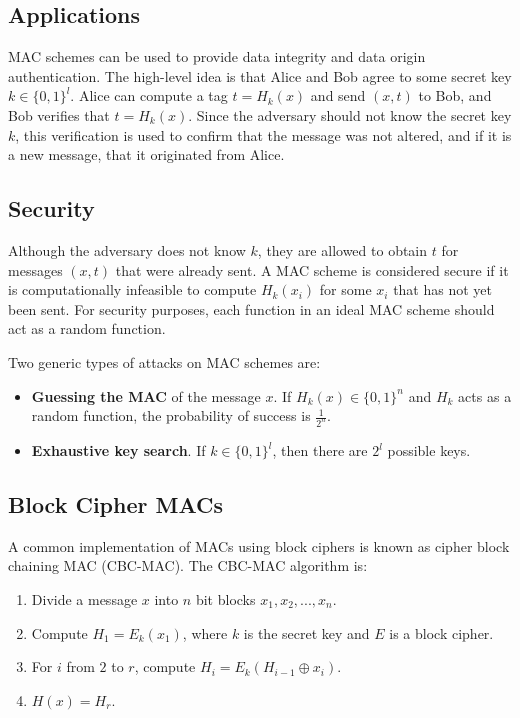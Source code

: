 \documentclass[12pt,titlepage]{article}
\begin{document}
    \subsection{Applications}
      MAC schemes can be used to provide data integrity and data origin authentication. The high-level idea is that Alice and Bob agree to some secret key $k \in \{0, 1\}^l$.
      Alice can compute a tag $t = H_k(x)$ and send $(x, t)$ to Bob, and Bob verifies that $t = H_k(x)$. Since the adversary should not know the secret key $k$, this verification
      is used to confirm that the message was not altered, and if it is a new message, that it originated from Alice.

    \subsection{Security}
      Although the adversary does not know $k$, they are allowed to obtain $t$ for messages $(x, t)$ that were already sent. A MAC scheme is considered secure if it is
      computationally infeasible to compute $H_k(x_i)$ for some $x_i$ that has not yet been sent. For security purposes, each function in an ideal MAC scheme should act
      as a random function.

      Two generic types of attacks on MAC schemes are:
      \begin{itemize}
        \item \textbf{Guessing the MAC} of the message $x$. If $H_k(x) \in \{0, 1\}^n$ and $H_k$ acts as a random function, the probability of success is $\frac{1}{2^n}$.
        \item \textbf{Exhaustive key search}. If $k \in \{0, 1\}^l$, then there are $2^l$ possible keys.
      \end{itemize}

    \subsection{Block Cipher MACs}
      A common implementation of MACs using block ciphers is known as cipher block chaining MAC (CBC-MAC). The CBC-MAC algorithm is:
      \begin{enumerate}
        \item Divide a message $x$ into $n$ bit blocks $x_1, x_2, ..., x_n$.
        \item Compute $H_1 = E_k(x_1)$, where $k$ is the secret key and $E$ is a block cipher.
        \item For $i$ from $2$ to $r$, compute $H_i = E_k(H_{i-1} \oplus x_i)$.
        \item $H(x) = H_r$.
      \end{enumerate}
\end{document}
